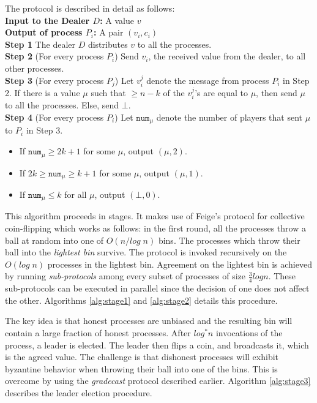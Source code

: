 The protocol is described in detail as follows: \\
\textbf{Input to the Dealer $D$:} A value $v$  \\
\textbf{Output of process $P_i$:} A pair $(v_i, c_i)$ \\
\textbf{Step 1} The dealer $D$ distributes $v$ to all the processes. \\
\textbf{Step 2} (For every process $P_i$) Send $v_i$, the received value from the dealer, to all other processes.  \\
\textbf{Step 3} (For every process $P_j$) Let $v_i^j$ denote the message from process $P_i$ in Step 2. If there is a value $\mu$ such that $\geq n - k$ of the $v_i^j$'s are equal to $\mu$, then send $\mu$ to all the processes. Else, send $\bot$. \\
\textbf{Step 4} (For every process $P_i$) Let $\mathtt{num}_\mu$ denote the number of players that sent $\mu$ to $P_i$ in Step 3. \\
\begin{itemize}
\item If $\mathtt{num}_\mu \geq 2k + 1$ for some $\mu$, output $(\mu, 2)$.
\item If $2k \geq \mathtt{num}_\mu \geq k + 1$ for some $\mu$, output $(\mu, 1)$.
\item If $\mathtt{num}_\mu \leq k $ for all $\mu$, output $(\bot, 0)$.
\end{itemize}



This algorithm proceeds in stages. It makes use of Feige's protocol \cite{Feige99} for collective coin-flipping which works as follows: in the first round, all the processes throw a ball at random into one of $O(n/log\;n)$ bins. The processes which throw their ball into the \textit{lightest bin} survive. The protocol is invoked recursively on the $O(log\;n)$ processes in the lightest bin. Agreement on the lightest bin is achieved by running \textit{sub-protocols} among every subset of processes of size $\frac{3}{4}logn$. These sub-protocols can be executed in parallel since the decision of one does not affect the other. Algorithms \ref{alg:stage1} and \ref{alg:stage2} details this procedure.

The key idea is that honest processes are unbiased and the resulting bin will contain a large fraction of honest processes. After $log^* n$ invocations of the process, a leader is elected. The leader then flips a coin, and broadcasts it, which is the agreed value. The challenge is that dishonest processes will exhibit byzantine behavior when throwing their ball into one of the bins. This is overcome by using the \textit{gradecast} protocol described earlier. Algorithm \ref{alg:stage3} describes the leader election procedure.

